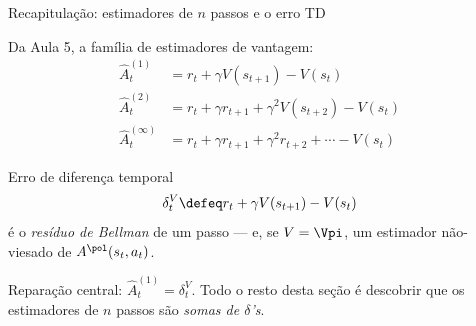 \documentclass[aspectratio=169, 10pt]{beamer}
\newcommand{\Ahat}{\hat{A}}
\newcommand{\Advpi}{A^{\pol}}
\begin{document}
\begin{frame}{Recapitulação: estimadores de $n$ passos e o erro TD}

  Da Aula 5, a família de estimadores de vantagem:
  \begin{align*}
    \Ahat^{(1)}_t &= r_t + \gamma V(s_{t+1}) - V(s_t)\\
    \Ahat^{(2)}_t &= r_t + \gamma r_{t+1} + \gamma^2 V(s_{t+2}) - V(s_t)\\
    \Ahat^{(\infty)}_t &= r_t + \gamma r_{t+1} + \gamma^2 r_{t+2} + \cdots - V(s_t)
  \end{align*}

  \begin{defbox}{Erro de diferença temporal}
    \[
      \delta^V_t \defeq r_t + \gamma V(s_{t+1}) - V(s_t)
    \]
    é o \emph{resíduo de Bellman} de um passo --- e, se $V = \Vpi$, um estimador
    não-viesado de $\Advpi(s_t,a_t)$.
  \end{defbox}

  \begin{ideiabox}
    Reparação central: $\Ahat^{(1)}_t = \delta^V_t$. Todo o resto desta seção é
    descobrir que os estimadores de $n$ passos são \emph{somas de $\delta$'s}.
  \end{ideiabox}
\end{frame}
\end{document}
